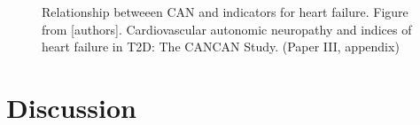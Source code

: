 \documentclass[
  a4paper,
  headsepline=true,
  open=any]{scrbook}
\begin{document}
\begin{figure}

\begin{minipage}[t]{\linewidth}

{\centering 


\caption{\label{fig-CAN}Relationship betweeen CAN and indicators for
heart failure. Figure from {[}authors{]}. Cardiovascular autonomic
neuropathy and indices of heart failure in T2D: The CANCAN Study. (Paper
III, appendix)}

}

\end{minipage}%

\end{figure}


\hypertarget{discussion}{%
\chapter{Discussion}\label{discussion}}
\end{document}
